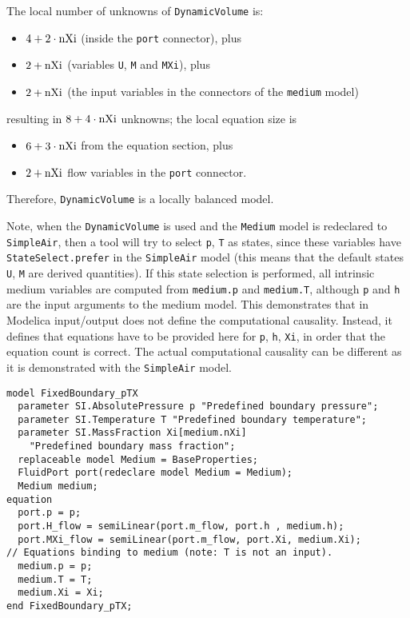\begin{example}
The local number of unknowns of \lstinline!DynamicVolume! is:
\begin{itemize}
\item
  $4 + 2 \cdot \text{\lstinline!nXi!}$ (inside the \lstinline!port! connector), plus
\item
  $2 + \text{\lstinline!nXi!}$ (variables \lstinline!U!, \lstinline!M! and \lstinline!MXi!), plus
\item
  $2 + \text{\lstinline!nXi!}$ (the input variables in the connectors of the \lstinline!medium! model)
\end{itemize}
resulting in $8 + 4 \cdot \text{\lstinline!nXi!}$ unknowns; the local equation size is
\begin{itemize}
\item
  $6 + 3 \cdot \text{\lstinline!nXi!}$ from the equation section, plus
\item
  $2 + \text{\lstinline!nXi!}$ flow variables in the \lstinline!port! connector.
\end{itemize}

Therefore, \lstinline!DynamicVolume! is a locally balanced model.

Note, when the \lstinline!DynamicVolume! is used and the \lstinline!Medium! model is redeclared to \lstinline!SimpleAir!, then a tool will try to select \lstinline!p!, \lstinline!T! as states, since these variables have \lstinline!StateSelect.prefer! in the \lstinline!SimpleAir! model (this means that the default states \lstinline!U!, \lstinline!M! are derived quantities).
If this state selection is performed, all intrinsic medium variables are computed from \lstinline!medium.p! and \lstinline!medium.T!, although \lstinline!p! and \lstinline!h! are the input arguments to the medium model.
This demonstrates that in Modelica input/output does not define the computational causality.
Instead, it defines that equations have to be provided here for \lstinline!p!, \lstinline!h!, \lstinline!Xi!, in order that the equation count is correct.
The actual computational causality can be different as it is demonstrated with the \lstinline!SimpleAir! model.

\begin{lstlisting}[language=modelica]
model FixedBoundary_pTX
  parameter SI.AbsolutePressure p "Predefined boundary pressure";
  parameter SI.Temperature T "Predefined boundary temperature";
  parameter SI.MassFraction Xi[medium.nXi]
    "Predefined boundary mass fraction";
  replaceable model Medium = BaseProperties;
  FluidPort port(redeclare model Medium = Medium);
  Medium medium;
equation
  port.p = p;
  port.H_flow = semiLinear(port.m_flow, port.h , medium.h);
  port.MXi_flow = semiLinear(port.m_flow, port.Xi, medium.Xi);
// Equations binding to medium (note: T is not an input).
  medium.p = p;
  medium.T = T;
  medium.Xi = Xi;
end FixedBoundary_pTX;
\end{lstlisting}


\end{example}

